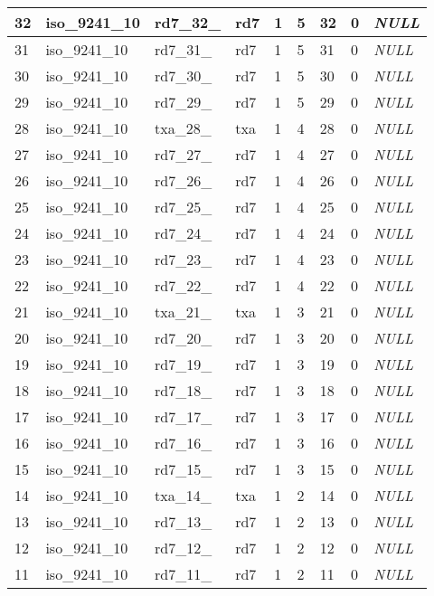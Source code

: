 \begin{longtable}{|l|l|l|l|l|l|l|l|l|}
32 & iso\_9241\_10 & rd7\_32\_ & rd7 & 1 & 5 & 32 & 0 & \textit{NULL} \\ \hline 
31 & iso\_9241\_10 & rd7\_31\_ & rd7 & 1 & 5 & 31 & 0 & \textit{NULL} \\ \hline 
30 & iso\_9241\_10 & rd7\_30\_ & rd7 & 1 & 5 & 30 & 0 & \textit{NULL} \\ \hline 
29 & iso\_9241\_10 & rd7\_29\_ & rd7 & 1 & 5 & 29 & 0 & \textit{NULL} \\ \hline 
28 & iso\_9241\_10 & txa\_28\_ & txa & 1 & 4 & 28 & 0 & \textit{NULL} \\ \hline 
27 & iso\_9241\_10 & rd7\_27\_ & rd7 & 1 & 4 & 27 & 0 & \textit{NULL} \\ \hline 
26 & iso\_9241\_10 & rd7\_26\_ & rd7 & 1 & 4 & 26 & 0 & \textit{NULL} \\ \hline 
25 & iso\_9241\_10 & rd7\_25\_ & rd7 & 1 & 4 & 25 & 0 & \textit{NULL} \\ \hline 
24 & iso\_9241\_10 & rd7\_24\_ & rd7 & 1 & 4 & 24 & 0 & \textit{NULL} \\ \hline 
23 & iso\_9241\_10 & rd7\_23\_ & rd7 & 1 & 4 & 23 & 0 & \textit{NULL} \\ \hline 
22 & iso\_9241\_10 & rd7\_22\_ & rd7 & 1 & 4 & 22 & 0 & \textit{NULL} \\ \hline 
21 & iso\_9241\_10 & txa\_21\_ & txa & 1 & 3 & 21 & 0 & \textit{NULL} \\ \hline 
20 & iso\_9241\_10 & rd7\_20\_ & rd7 & 1 & 3 & 20 & 0 & \textit{NULL} \\ \hline 
19 & iso\_9241\_10 & rd7\_19\_ & rd7 & 1 & 3 & 19 & 0 & \textit{NULL} \\ \hline 
18 & iso\_9241\_10 & rd7\_18\_ & rd7 & 1 & 3 & 18 & 0 & \textit{NULL} \\ \hline 
17 & iso\_9241\_10 & rd7\_17\_ & rd7 & 1 & 3 & 17 & 0 & \textit{NULL} \\ \hline 
16 & iso\_9241\_10 & rd7\_16\_ & rd7 & 1 & 3 & 16 & 0 & \textit{NULL} \\ \hline 
15 & iso\_9241\_10 & rd7\_15\_ & rd7 & 1 & 3 & 15 & 0 & \textit{NULL} \\ \hline 
14 & iso\_9241\_10 & txa\_14\_ & txa & 1 & 2 & 14 & 0 & \textit{NULL} \\ \hline 
13 & iso\_9241\_10 & rd7\_13\_ & rd7 & 1 & 2 & 13 & 0 & \textit{NULL} \\ \hline 
12 & iso\_9241\_10 & rd7\_12\_ & rd7 & 1 & 2 & 12 & 0 & \textit{NULL} \\ \hline 
11 & iso\_9241\_10 & rd7\_11\_ & rd7 & 1 & 2 & 11 & 0 & \textit{NULL} \\ \hline 

\end{longtable}

